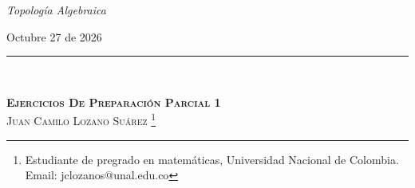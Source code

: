 \normalsize{
    \noindent\textit{Topología Algebraica}

    \vspace{-0.1cm}
    \noindent Octubre 27 de 2026
    
    \vspace{-0.2cm}
}
\noindent\rule{10cm}{0.1pt}\\
\vspace{0.5cm}
\begin{center}
   \textsc{
      \Large{\textbf{Ejercicios De Preparación Parcial 1}}
   }\\ \vspace{0.7cm}
   \large{\textsc{Juan Camilo Lozano Suárez \footnote{Estudiante de pregrado en matemáticas, Universidad Nacional de Colombia.\\Email: jclozanos@unal.edu.co}}}\\ \vspace{0.5cm}
\end{center}
\hspace{3.5cm} \hrulefill \hspace{3.5cm}
